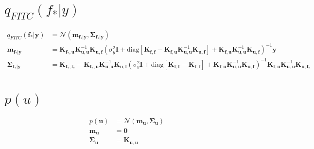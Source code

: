 \documentclass[12pt, landscape]{article}
\begin{document}
\section{$q_{FITC}(f_{*}|y)$}
\begingroup\makeatletter{}\check@mathfonts
\def\maketag@@@#1{\hbox{\m@th\large\normalfont#1}}
\begin{align*}
q_{FITC}\left(\mathbf{f_{*}}|\mathbf{y}\right)&= \mathcal{N}\left(\mathbf{m}_{\mathbf{f_{*}}|\mathbf{y}},\mathbf{\Sigma}_{\mathbf{f_{*}}|\mathbf{y}}\right)\\
\mathbf{m}_{\mathbf{f_{*}}|\mathbf{y}} &= \mathbf{K}_{\mathbf{f_{*}},\mathbf{u}} \mathbf{K}_{\mathbf{u},\mathbf{u}}^{-1} \mathbf{K}_{\mathbf{u},\mathbf{f}} \left(\sigma_y^{2} \mathbf{I} + \text{diag}[\mathbf{K}_{\mathbf{f},\mathbf{f}} - \mathbf{K}_{\mathbf{f},\mathbf{u}} \mathbf{K}_{\mathbf{u},\mathbf{u}}^{-1} \mathbf{K}_{\mathbf{u},\mathbf{f}}] + \mathbf{K}_{\mathbf{f},\mathbf{u}} \mathbf{K}_{\mathbf{u},\mathbf{u}}^{-1} \mathbf{K}_{\mathbf{u},\mathbf{f}}\right)^{-1} \mathbf{y}\\
\mathbf{\Sigma}_{\mathbf{f_{*}}|\mathbf{y}} &= \mathbf{K}_{\mathbf{f_{*}},\mathbf{f_{*}}} - \mathbf{K}_{\mathbf{f_{*}},\mathbf{u}} \mathbf{K}_{\mathbf{u},\mathbf{u}}^{-1} \mathbf{K}_{\mathbf{u},\mathbf{f}} \left(\sigma_y^{2} \mathbf{I} + \text{diag}[\mathbf{K}_{\mathbf{f},\mathbf{f}} - \mathbf{K}_{\mathbf{f},\mathbf{f}}] + \mathbf{K}_{\mathbf{f},\mathbf{u}} \mathbf{K}_{\mathbf{u},\mathbf{u}}^{-1} \mathbf{K}_{\mathbf{u},\mathbf{f}}\right)^{-1} \mathbf{K}_{\mathbf{f},\mathbf{u}} \mathbf{K}_{\mathbf{u},\mathbf{u}}^{-1} \mathbf{K}_{\mathbf{u},\mathbf{f_{*}}}\\
\end{align*}\endgroup

\section{$p(u)$}
\begingroup\makeatletter{}\check@mathfonts
\def\maketag@@@#1{\hbox{\m@th\large\normalfont#1}}
\begin{align*}
p\left(\mathbf{u}\right)&= \mathcal{N}\left(\mathbf{m}_{\mathbf{u}},\mathbf{\Sigma}_{\mathbf{u}}\right)\\
\mathbf{m}_{\mathbf{u}} &= \mathbf{0}\\
\mathbf{\Sigma}_{\mathbf{u}} &= \mathbf{K}_{\mathbf{u},\mathbf{u}}\\
\end{align*}\endgroup
\end{document}
